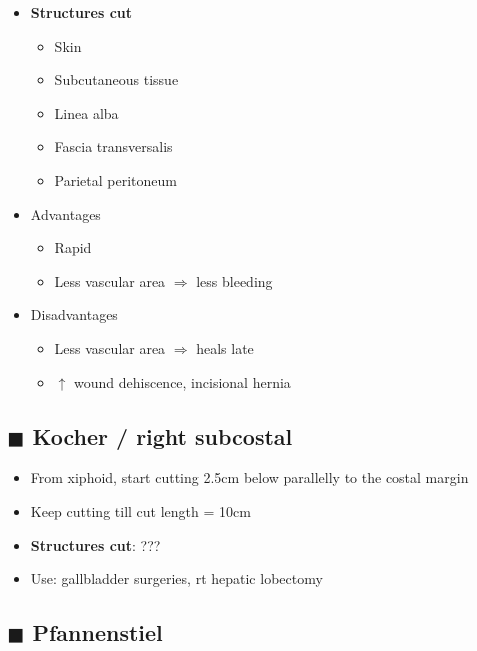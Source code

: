 \documentclass[
  12pt,
]{memoir}
\providecommand{\tightlist}{%
  \setlength{\itemsep}{0pt}\setlength{\parskip}{0pt}}
\begin{document}
\begin{itemize}
\tightlist
\item
  \textbf{Structures cut}

  \begin{itemize}
  \tightlist
  \item
    Skin
  \item
    Subcutaneous tissue
  \item
    Linea alba
  \item
    Fascia transversalis
  \item
    Parietal peritoneum
  \end{itemize}
\item
  Advantages

  \begin{itemize}
  \tightlist
  \item
    Rapid
  \item
    Less vascular area \(\Rightarrow\) less bleeding
  \end{itemize}
\item
  Disadvantages

  \begin{itemize}
  \tightlist
  \item
    Less vascular area \(\Rightarrow\) heals late
  \item
    \(\uparrow\) wound dehiscence, incisional hernia
  \end{itemize}
\end{itemize}

\hypertarget{blacksquare-kocher-right-subcostal}{%
\subsection{\texorpdfstring{\(\blacksquare\) Kocher / right
subcostal}{\textbackslash blacksquare Kocher / right subcostal}}\label{blacksquare-kocher-right-subcostal}}

\begin{itemize}
\tightlist
\item
  From xiphoid, start cutting 2.5cm below parallelly to the costal
  margin
\item
  Keep cutting till cut length = 10cm
\item
  \textbf{Structures cut}: ???
\item
  Use: gallbladder surgeries, rt hepatic lobectomy
\end{itemize}

\hypertarget{blacksquare-pfannenstiel}{%
\subsection{\texorpdfstring{\(\blacksquare\)
Pfannenstiel}{\textbackslash blacksquare Pfannenstiel}}\label{blacksquare-pfannenstiel}}
\end{document}
